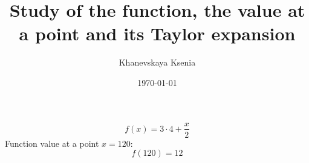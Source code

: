 \documentclass[12pt, letterpaper]{article}
\title {Study of the function, the value at a point and its Taylor expansion}
\author{Khanevskaya Ksenia}
\date{\today}
\begin{document}
\maketitle
\[f(x)=3\cdot4+\frac{x}{2}\]
Function value at a point $x=120$: \[f(120)=12\]
\end{document}
